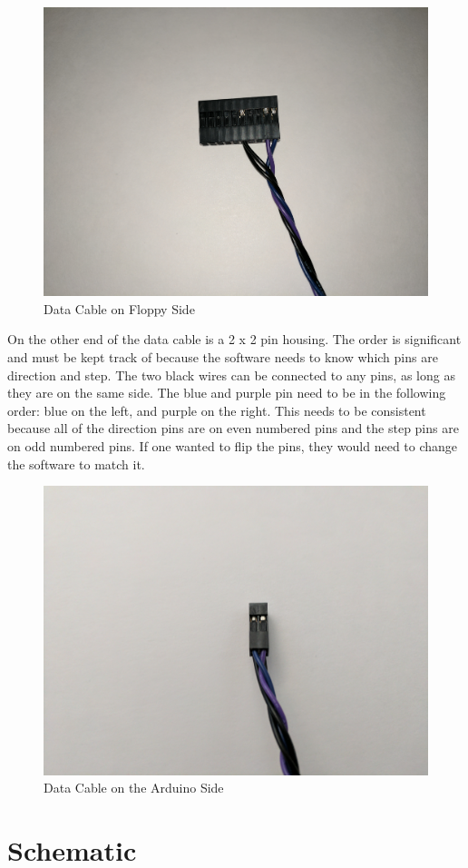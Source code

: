 \documentclass[11pt, a4paper]{report}
\begin{document}
\begin{figure}[H]
\hspace*{-2cm}    
    \centering
    \includegraphics[width=.5\textwidth]{floppy_wire.jpg}
    \caption{Data Cable on Floppy Side}
    \label{fig:floppywire}
\end{figure}


On the other end of the data cable is a 2 x 2 pin housing. The order is significant and must be kept track of because the software needs to know which pins are direction and step. The two black wires can be connected to any pins, as long as they are on the same side. The blue and purple pin need to be in the following order: blue on the left, and purple on the right. This needs to be consistent because all of the direction pins are on even numbered pins and the step pins are on odd numbered pins. If one wanted to flip the pins, they would need to change the software to match it. \\

\begin{figure}[H]
\hspace*{-2cm}    
    \centering
    \includegraphics[width=.5\textwidth]{arduino_wire.jpg}
    \caption{Data Cable on the Arduino Side}
    \label{fig:arduinowire}
\end{figure}


\section{Schematic}
\end{document}
